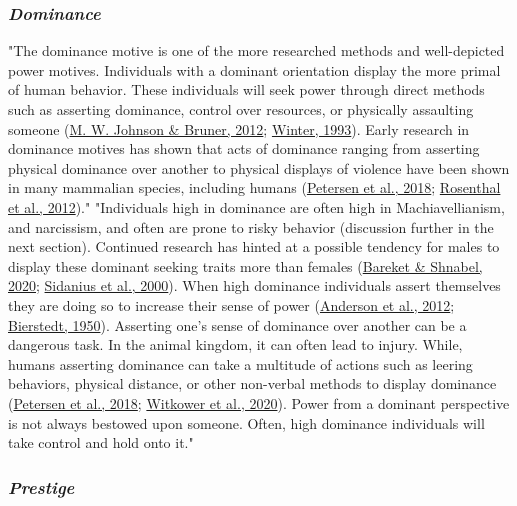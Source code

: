 \documentclass[
"  donotrepeattitle,doc, 12pt, a4paper,floatsintext]{apa7}"
\begin{document}
\hypertarget{dominance}{%
\subsubsection{\texorpdfstring{\emph{Dominance}}{Dominance}}\label{dominance}}
"The dominance motive is one of the more researched methods and well-depicted power motives. Individuals with a dominant orientation display the more primal of human behavior. These individuals will seek power through direct methods such as asserting dominance, control over resources, or physically assaulting someone (\protect\hyperlink{ref-johnson2012}{M. W. Johnson \& Bruner, 2012}; \protect\hyperlink{ref-winter1993}{Winter, 1993}). Early research in dominance motives has shown that acts of dominance ranging from asserting physical dominance over another to physical displays of violence have been shown in many mammalian species, including humans (\protect\hyperlink{ref-petersen2018}{Petersen et al., 2018}; \protect\hyperlink{ref-rosenthal2012}{Rosenthal et al., 2012})."
"Individuals high in dominance are often high in Machiavellianism, and narcissism, and often are prone to risky behavior (discussion further in the next section). Continued research has hinted at a possible tendency for males to display these dominant seeking traits more than females (\protect\hyperlink{ref-bareket2020}{Bareket \& Shnabel, 2020}; \protect\hyperlink{ref-sidanius2000}{Sidanius et al., 2000}). When high dominance individuals assert themselves they are doing so to increase their sense of power (\protect\hyperlink{ref-anderson2012}{Anderson et al., 2012}; \protect\hyperlink{ref-bierstedt1950}{Bierstedt, 1950}). Asserting one's sense of dominance over another can be a dangerous task. In the animal kingdom, it can often lead to injury. While, humans asserting dominance can take a multitude of actions such as leering behaviors, physical distance, or other non-verbal methods to display dominance (\protect\hyperlink{ref-petersen2018}{Petersen et al., 2018}; \protect\hyperlink{ref-witkower2020}{Witkower et al., 2020}). Power from a dominant perspective is not always bestowed upon someone. Often, high dominance individuals will take control and hold onto it."
\hypertarget{prestige}{%
\subsubsection{\texorpdfstring{\emph{Prestige}}{Prestige}}\label{prestige}}
\end{document}
